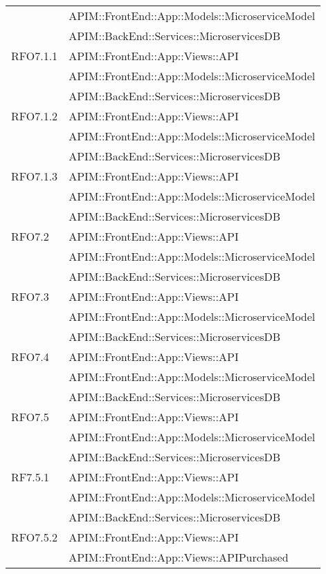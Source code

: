 \begin{longtable}{ p{4cm} | p{12cm} }
			& APIM::FrontEnd::App::Models::MicroserviceModel \\
			& APIM::BackEnd::Services::MicroservicesDB \\
			\hline		
			RFO7.1.1
			& APIM::FrontEnd::App::Views::API \\
			& APIM::FrontEnd::App::Models::MicroserviceModel \\
			& APIM::BackEnd::Services::MicroservicesDB \\
			\hline		
			RFO7.1.2
			& APIM::FrontEnd::App::Views::API \\
			& APIM::FrontEnd::App::Models::MicroserviceModel \\
			& APIM::BackEnd::Services::MicroservicesDB \\
			\hline		
			RFO7.1.3
			& APIM::FrontEnd::App::Views::API \\
			& APIM::FrontEnd::App::Models::MicroserviceModel \\
			& APIM::BackEnd::Services::MicroservicesDB \\
			\hline		
			RFO7.2
			& APIM::FrontEnd::App::Views::API \\
			& APIM::FrontEnd::App::Models::MicroserviceModel \\
			& APIM::BackEnd::Services::MicroservicesDB \\
			\hline		
			RFO7.3
			& APIM::FrontEnd::App::Views::API \\
			& APIM::FrontEnd::App::Models::MicroserviceModel \\
			& APIM::BackEnd::Services::MicroservicesDB \\
			\hline		
			RFO7.4
			& APIM::FrontEnd::App::Views::API \\
			& APIM::FrontEnd::App::Models::MicroserviceModel \\
			& APIM::BackEnd::Services::MicroservicesDB \\
			\hline	
			RFO7.5
			& APIM::FrontEnd::App::Views::API \\
			& APIM::FrontEnd::App::Models::MicroserviceModel \\
			& APIM::BackEnd::Services::MicroservicesDB \\
			\hline			
			RF7.5.1
			& APIM::FrontEnd::App::Views::API \\
			& APIM::FrontEnd::App::Models::MicroserviceModel \\
			& APIM::BackEnd::Services::MicroservicesDB \\
			\hline		
			RFO7.5.2
			& APIM::FrontEnd::App::Views::API \\
			& APIM::FrontEnd::App::Views::APIPurchased \\

\end{longtable}
